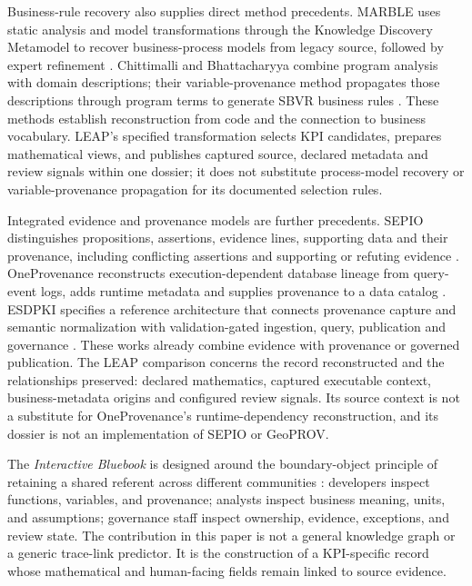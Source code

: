 \documentclass[a4paper,fleqn]{cas-dc}
\newcommand{\bluebook}{\emph{Interactive Bluebook}}
\begin{document}
Business-rule recovery also supplies direct method precedents. MARBLE uses static analysis and model transformations through the Knowledge Discovery Metamodel to recover business-process models from legacy source, followed by expert refinement \citep{PerezCastillo2011MARBLE}. Chittimalli and Bhattacharyya combine program analysis with domain descriptions; their variable-provenance method propagates those descriptions through program terms to generate SBVR business rules \citep{Chittimalli2019SBVR}. These methods establish reconstruction from code and the connection to business vocabulary. LEAP's specified transformation selects KPI candidates, prepares mathematical views, and publishes captured source, declared metadata and review signals within one dossier; it does not substitute process-model recovery or variable-provenance propagation for its documented selection rules.

Integrated evidence and provenance models are further precedents. SEPIO distinguishes propositions, assertions, evidence lines, supporting data and their provenance, including conflicting assertions and supporting or refuting evidence \citep{Brush2016SEPIO}. OneProvenance reconstructs execution-dependent database lineage from query-event logs, adds runtime metadata and supplies provenance to a data catalog \citep{Psallidas2023OneProvenance}. ESDPKI specifies a reference architecture that connects provenance capture and semantic normalization with validation-gated ingestion, query, publication and governance \citep{Sadiq2026ESDPKI}. These works already combine evidence with provenance or governed publication. The LEAP comparison concerns the record reconstructed and the relationships preserved: declared mathematics, captured executable context, business-metadata origins and configured review signals. Its source context is not a substitute for OneProvenance's runtime-dependency reconstruction, and its dossier is not an implementation of SEPIO or GeoPROV.

The \bluebook{} is designed around the boundary-object principle of retaining a shared referent across different communities \citep{StarGriesemer1989}: developers inspect functions, variables, and provenance; analysts inspect business meaning, units, and assumptions; governance staff inspect ownership, evidence, exceptions, and review state. The contribution in this paper is not a general knowledge graph or a generic trace-link predictor. It is the construction of a KPI-specific record whose mathematical and human-facing fields remain linked to source evidence.
\end{document}
